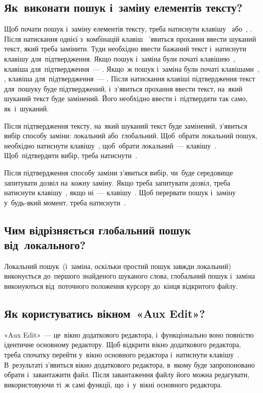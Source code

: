 \documentclass[
	a4paper,
	oneside,
	BCOR = 10mm,
	DIV = 12,
	12pt,
	headings = normal,
]{scrartcl}
\begin{document}
		\subsection{Як~виконати пошук і~заміну елементів тексту?}
			Щоб почати пошук і~заміну елементів тексту, треба натиснути клавішу~ або~, . Після натискання однієї з~комбінацій клавіш ~'явиться прохання ввести шуканий текст, який треба замінити. Туди необхідно ввести бажаний текст і~натиснути клавішу для~підтвердження. Якщо пошук і~заміна були початі клавішею~, клавіша для~підтвердження~— . Якщо~ж пошук і~заміна були початі клавішами~, , клавіша для~підтвердження~— \keys{\return}. Після натискання клавіші підтвердження текст для~пошуку буде підтверджений, і~з'я\-ви\-ться прохання ввести текст, на~який шуканий текст буде замінений. Його необхідно ввести і~підтвердити так само, як~і~шуканий. 

			Після підтвердження тексту, на~який шуканий текст буде замінений, з'я\-ви\-ться вибір способу заміни: локальний або~глобальний. Щоб~обрати локальний пошук, необхідно натиснути клавішу~, щоб~обрати локальний~— клавішу~. Щоб~підтвердити вибір, треба натиснути~\keys{\return}.

			Після підтвердження способу заміни з'я\-ви\-ться вибір, чи~буде середовище запитувати дозвіл на~кожну заміну. Якщо треба запитувати дозвіл, треба натиснути клавішу~, якщо ні~— клавішу~. Щоб перервати пошук і~заміну у~будь-який момент, треба натиснути~\keys{\esc}.

		\subsection{Чим відрізняється глобальний пошук від~локального?}
			Локальний пошук~(і~заміна, оскільки простий пошук завжди локальний) виконується до~першого знайденого шуканого слова, глобальний пошук і~заміна виконуються від~поточного положення курсору до~кінця відкритого файлу. 

		\subsection{Як користуватись вікном~«\textenglish{Aux Edit}»?}
			«\textenglish{Aux Edit}»~— це~вікно додаткового редактора, і~функціонально воно повністю ідентичне основному редактору. Щоб відкрити вікно додаткового редактора, треба спочатку перейти у~вікно основного редактора і~натиснути клавішу~. В~результаті з'я\-ви\-ться вікно додаткового редактора, в~якому буде запропоновано обрати і~завантажити файл. Після завантаження файлу його можна редагувати, використовуючи ті~ж самі функції, що~і~у~вікні основного редактора. 
\end{document}
